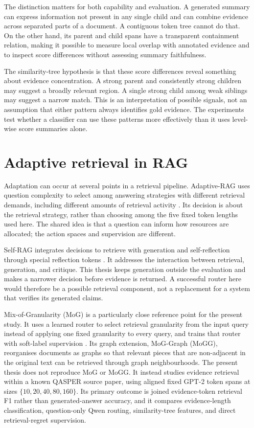 The distinction matters for both capability and evaluation. A generated
summary can express information not present in any single child and can
combine evidence across separated parts of a document. A contiguous
token tree cannot do that. On the other hand, its parent and child
spans have a transparent containment relation, making it possible to
measure local overlap with annotated evidence and to inspect score
differences without assessing summary faithfulness.

The similarity-tree hypothesis is that these score differences reveal
something about evidence concentration. A strong parent and consistently
strong children may suggest a broadly relevant region. A single strong
child among weak siblings may suggest a narrow match. This is an
interpretation of possible signals, not an assumption that either
pattern always identifies gold evidence. The experiments test whether
a classifier can use these patterns more effectively than it uses
level-wise score summaries alone.

\section{Adaptive retrieval in RAG}
Adaptation can occur at several points in a retrieval pipeline.
Adaptive-RAG uses question complexity to select among answering
strategies with different retrieval demands, including different
amounts of retrieval activity \cite{jeong2024adaptive}. Its decision is
about the retrieval strategy, rather than choosing among the five
fixed token lengths used here. The shared idea is that a question can
inform how resources are allocated; the action spaces and supervision
are different.

Self-RAG integrates decisions to retrieve with generation and
self-reflection through special reflection tokens
\cite{asai2023selfrag}. It addresses the interaction between retrieval,
generation, and critique. This thesis keeps generation outside the
evaluation and makes a narrower decision before evidence is returned.
A successful router here would therefore be a possible retrieval
component, not a replacement for a system that verifies its generated
claims.

Mix-of-Granularity (MoG) is a particularly close reference point for
the present study. It uses a learned router to select retrieval
granularity from the input query instead of applying one fixed
granularity to every query, and trains that router with soft-label
supervision \cite{zhong-etal-2025-mix}. Its graph extension,
MoG-Graph (MoGG), reorganises documents as graphs so that relevant
pieces that are non-adjacent in the original text can be retrieved
through graph neighbourhoods. The present thesis does not reproduce
MoG or MoGG. It instead studies evidence retrieval within a known
QASPER source paper, using aligned fixed GPT-2 token spans at sizes
$\{10,20,40,80,160\}$. Its primary outcome is joined evidence-token
retrieval F1 rather than generated-answer accuracy, and it compares
evidence-length classification, question-only Qwen routing,
similarity-tree features, and direct retrieval-regret supervision.

